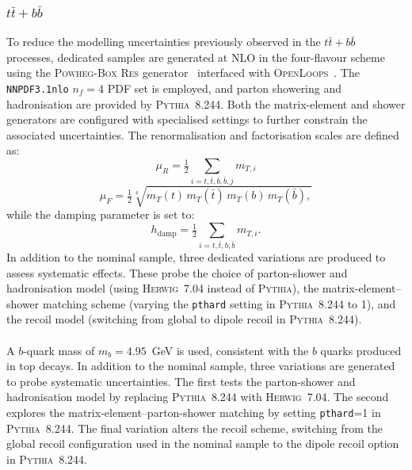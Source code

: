\subsubsection{$t\bar{t}+b\bar{b}$}
To reduce the modelling uncertainties previously observed in the $t\bar{t}+b\bar{b}$ processes, dedicated samples are generated at NLO in the four-flavour scheme using the \textsc{Powheg-Box Res} generator~\cite{Jezo:2015aia} interfaced with \textsc{OpenLoops}~\cite{Cascioli:2011va}. The \verb|NNPDF3.1nlo| $n_{f}=4$ PDF set is employed, and parton showering and hadronisation are provided by \textsc{Pythia}~8.244. Both the matrix-element and shower generators are configured with specialised settings to further constrain the associated uncertainties. The renormalisation and factorisation scales are defined as:
\begin{equation}
\mu_{R} = \tfrac{1}{2} \sum_{i=t,\bar{t},b,\bar{b},j} m_{T,i}
\end{equation}
\begin{equation}
\mu_{F} = \tfrac{1}{2} \sqrt[4]{m_{T}(t)\, m_{T}(\bar{t})\, m_{T}(b)\, m_{T}(\bar{b}),}
\end{equation}
while the damping parameter is set to:
\begin{equation}
h_{\text{damp}} = \tfrac{1}{2} \sum_{i=t,\bar{t},b,\bar{b}} m_{T,i}.
\end{equation}
In addition to the nominal sample, three dedicated variations are produced to assess systematic effects. These probe the choice of parton-shower and hadronisation model (using \textsc{Herwig}~7.04 instead of \textsc{Pythia}), the matrix-element–shower matching scheme (varying the \texttt{pthard} setting in \textsc{Pythia}~8.244 to 1), and the recoil model (switching from global to dipole recoil in \textsc{Pythia}~8.244).\\
\\
A $b$-quark mass of $m_{b}=4.95$~GeV is used, consistent with the $b$ quarks produced in top decays. In addition to the nominal sample, three variations are generated to probe systematic uncertainties. The first tests the parton-shower and hadronisation model by replacing \textsc{Pythia}~8.244 with \textsc{Herwig}~7.04. The second explores the matrix-element–parton-shower matching by setting \texttt{pthard}=1 in \textsc{Pythia}~8.244. The final variation alters the recoil scheme, switching from the global recoil configuration used in the nominal sample to the dipole recoil option in \textsc{Pythia}~8.244.  
